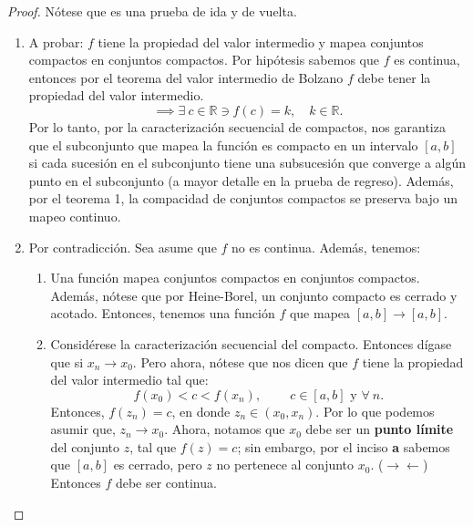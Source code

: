 \begin{proof}
	Nótese que es una prueba de ida y de vuelta.
	\begin{enumerate}
		\item[\fbox{$\to$}] A probar: $f$ tiene la propiedad del valor intermedio y mapea conjuntos compactos en conjuntos compactos. Por hipótesis sabemos que $f$ es continua, entonces por el teorema del valor intermedio de Bolzano $f$ debe tener la propiedad del valor intermedio.  $$\implies \exists \ c \in \mathbb{R} \ni f(c)=k, \quad k \in \mathbb{R}.$$
		Por lo tanto, por la caracterización secuencial de compactos, nos garantiza que el subconjunto que mapea la función es compacto en un intervalo $[a,b]$ si cada sucesión en el subconjunto  tiene una subsucesión que converge a algún punto en el subconjunto (a mayor detalle en la prueba de regreso). Además,  por el teorema 1, la compacidad de conjuntos compactos se preserva bajo un mapeo continuo. 
		
		\item [\fbox{$\gets$}] Por contradicción. Sea asume que $f$ no es continua. Además, tenemos:
		\begin{enumerate}
			\item Una función mapea conjuntos compactos en conjuntos compactos. Además, nótese que por Heine-Borel, un conjunto compacto es cerrado y acotado. Entonces, tenemos una función $f$ que mapea $[a,b]\to [a,b]$.
			\item  Considérese la caracterización secuencial del compacto. Entonces dígase que si $x_n\to x_0$. Pero ahora, nótese que nos dicen que $f$ tiene la propiedad del valor intermedio tal que: 
			$$f(x_0)<c<f(x_n), \qquad \ c\in [a,b] \text{ y } \forall \ n.$$ 
			Entonces, $f(z_n)=c$, en donde $z_n\in (x_0, x_n)$. Por lo que podemos asumir que, $z_n \to x_0$. Ahora, notamos que $x_0$ debe ser un \textbf{punto límite} del conjunto $z$, tal que $f(z)=c$; sin embargo, por el inciso \textbf{a} sabemos que $[a,b]$ es cerrado, pero $z$ no pertenece al conjunto $x_0$. ($\to\gets$) Entonces $f$ debe ser continua.
		\end{enumerate}
		
	\end{enumerate}
\end{proof}
